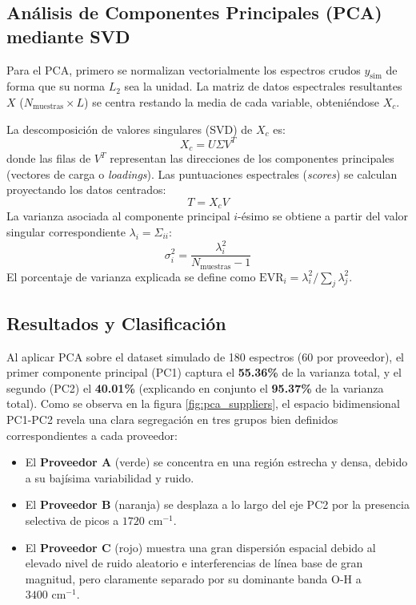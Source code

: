 \subsection{Análisis de Componentes Principales (PCA) mediante SVD}
Para el PCA, primero se normalizan vectorialmente los espectros crudos $y_{\text{sim}}$ de forma que su norma $L_2$ sea la unidad. La matriz de datos espectrales resultantes $X$ ($N_{\text{muestras}} \times L$) se centra restando la media de cada variable, obteniéndose $X_c$.

La descomposición de valores singulares (SVD) de $X_c$ es:
\begin{equation}
    X_c = U \Sigma V^T
\end{equation}
donde las filas de $V^T$ representan las direcciones de los componentes principales (vectores de carga o \textit{loadings}). Las puntuaciones espectrales (\textit{scores}) se calculan proyectando los datos centrados:
\begin{equation}
    T = X_c V
\end{equation}
La varianza asociada al componente principal $i$-ésimo se obtiene a partir del valor singular correspondiente $\lambda_i = \Sigma_{ii}$:
\begin{equation}
    \sigma^2_i = \frac{\lambda_i^2}{N_{\text{muestras}} - 1}
\end{equation}
El porcentaje de varianza explicada se define como $\text{EVR}_i = \lambda_i^2 / \sum_j \lambda_j^2$.

\subsection{Resultados y Clasificación}
Al aplicar PCA sobre el dataset simulado de 180 espectros (60 por proveedor), el primer componente principal (PC1) captura el \textbf{55.36\%} de la varianza total, y el segundo (PC2) el \textbf{40.01\%} (explicando en conjunto el \textbf{95.37\%} de la varianza total). Como se observa en la figura \ref{fig:pca_suppliers}, el espacio bidimensional PC1-PC2 revela una clara segregación en tres grupos bien definidos correspondientes a cada proveedor:
\begin{itemize}
    \item El \textbf{Proveedor A} (verde) se concentra en una región estrecha y densa, debido a su bajísima variabilidad y ruido.
    \item El \textbf{Proveedor B} (naranja) se desplaza a lo largo del eje PC2 por la presencia selectiva de picos a $1720\text{ cm}^{-1}$.
    \item El \textbf{Proveedor C} (rojo) muestra una gran dispersión espacial debido al elevado nivel de ruido aleatorio e interferencias de línea base de gran magnitud, pero claramente separado por su dominante banda O-H a $3400\text{ cm}^{-1}$.
\end{itemize}

